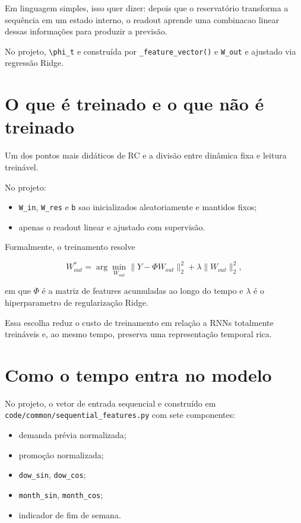 \documentclass[12pt]{article}
\providecommand{\tightlist}{%
  \setlength{\itemsep}{0pt}\setlength{\parskip}{0pt}}
\begin{document}
Em linguagem simples, isso quer dizer: depois que o reservatório transforma a sequência em um estado interno, o readout aprende uma combinacao linear dessas informações para produzir a previsão.

No projeto, \texttt{\textbackslash{}phi\_t} e construída por \texttt{\_feature\_vector()} e \texttt{W\_out} e ajustado via regressão Ridge.

\section{O que é treinado e o que não é treinado}\label{4-o-que-uxe9-treinado-e-o-que-nuxe3o-uxe9-treinado}

Um dos pontos mais didáticos de RC e a divisão entre dinâmica fixa e leitura treinável.

No projeto:

\begin{itemize}
\tightlist
\item
  \texttt{W\_in}, \texttt{W\_res} e \texttt{b} sao inicializados aleatoriamente e mantidos fixos;
\item
  apenas o readout linear e ajustado com supervisão.
\end{itemize}

Formalmente, o treinamento resolve

\[
W_{out}^* = \arg\min_{W_{out}}
\|Y - \Phi W_{out}\|_2^2 + \lambda \|W_{out}\|_2^2,
\]

em que \(\Phi\) é a matriz de features acumuladas ao longo do tempo e \(\lambda\) é o hiperparametro de regularização Ridge.

Essa escolha reduz o custo de treinamento em relação a RNNs totalmente treináveis e, ao mesmo tempo, preserva uma representação temporal rica.

\section{Como o tempo entra no modelo}\label{5-como-o-tempo-entra-no-modelo}

No projeto, o vetor de entrada sequencial e construído em \texttt{code/common/sequential\_features.py} com sete componentes:

\begin{itemize}
\tightlist
\item
  demanda prévia normalizada;
\item
  promoção normalizada;
\item
  \texttt{dow\_sin}, \texttt{dow\_cos};
\item
  \texttt{month\_sin}, \texttt{month\_cos};
\item
  indicador de fim de semana.
\end{itemize}
\end{document}
